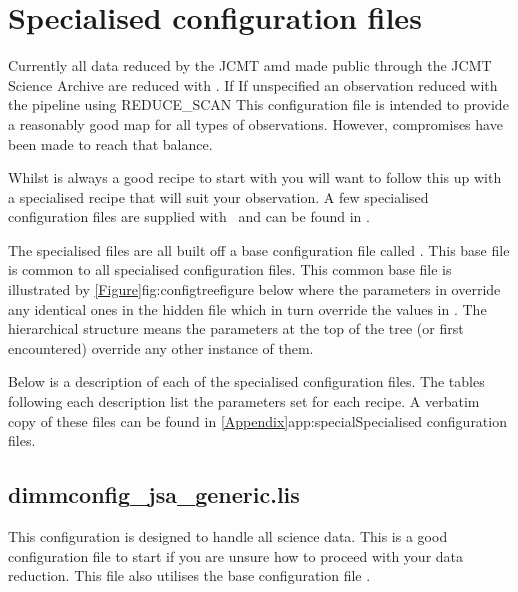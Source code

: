 \section{Specialised configuration files}
\label{sec:config}

Currently all data reduced by the JCMT amd made public through the JCMT Science 
Archive are reduced with . If 
If unspecified an observation reduced with the pipeline using REDUCE\_SCAN
This configuration file is intended to provide a reasonably good map 
for all types of observations. However, compromises have been made to reach 
that balance.

Whilst  is always a good recipe to start with
you will want to follow this up with a specialised recipe that will suit
your observation. A few specialised configuration files are supplied with
\smurf\ and can be found in .

The specialised files are all built off a base configuration file called 
. This base file is common to all specialised configuration files.
This common base file is illustrated by \cref{Figure}{fig:configtree}{figure below} where
the parameters in  override
any identical ones in the hidden file  which in turn
override the values in . The hierarchical
structure means the parameters at the top of the tree (or first
encountered) override any other instance of them.


Below is a description of each of the specialised configuration files.
The tables following each description list the parameters set for each
recipe. A verbatim copy of these files can be found in
\cref{Appendix}{app:special}{Specialised configuration files}.

\subsection{dimmconfig\_jsa\_generic.lis}

This configuration is designed to handle all science data. This is a good 
configuration file to start if you are unsure how to proceed with your 
data reduction. This file also utilises the base configuration file .

